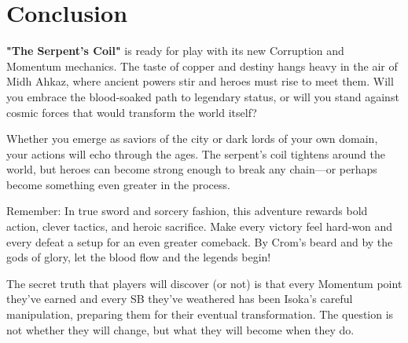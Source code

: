 \documentclass[11pt]{article}
\begin{document}
\newpage

\section*{Conclusion}

\textbf{"The Serpent's Coil"} is ready for play with its new Corruption and Momentum mechanics. The taste of copper and destiny hangs heavy in the air of Midh Ahkaz, where ancient powers stir and heroes must rise to meet them. Will you embrace the blood-soaked path to legendary status, or will you stand against cosmic forces that would transform the world itself?

Whether you emerge as saviors of the city or dark lords of your own domain, your actions will echo through the ages. The serpent's coil tightens around the world, but heroes can become strong enough to break any chain—or perhaps become something even greater in the process.

Remember: In true sword and sorcery fashion, this adventure rewards bold action, clever tactics, and heroic sacrifice. Make every victory feel hard-won and every defeat a setup for an even greater comeback. By Crom's beard and by the gods of glory, let the blood flow and the legends begin!

The secret truth that players will discover (or not) is that every Momentum point they've earned and every SB they've weathered has been Isoka's careful manipulation, preparing them for their eventual transformation. The question is not whether they will change, but what they will become when they do.
\end{document}
